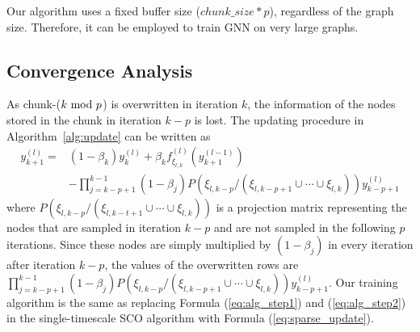 Our algorithm uses a fixed buffer size ($chunk\_size* p$), regardless of the graph size. 
Therefore, it can be employed to train GNN on very large graphs. 

\subsection{Convergence Analysis} 
As chunk-($k\ \mathrm{mod}\ p$) is overwritten in iteration $k$, the information of the nodes stored in the chunk in iteration $k-p$ is lost.  
The updating procedure in Algorithm~\ref{alg:update} can be written as 
  \begin{equation}
    \label{eq:sparse_update}
    \begin{split}
      y^{(l)}_{k+1} = &(1-\beta_{k})y^{(l)}_k + \beta_{k}  f^{(l)}_{\xi_{l,k}}(y^{(l-1)}_{k+1})\\
               &-\prod_{j=k-p+1}^{k-1}(1-\beta_j)P(\xi_{l, {k-p}}/(\xi_{l,{k-p+1}}\cup\cdots \cup\xi_{l,k}))y^{(l)}_{k-p+1}
    \end{split}
  \end{equation}
   where $P(\xi_{l, {k-p}}/(\xi_{l,{k-t+1}}\cup\cdots \cup\xi_{l,k}))$ is a projection matrix representing the nodes that are sampled in iteration $k-p$ and are not sampled in the following $p$ iterations. 
  Since these nodes are simply multiplied by $(1-\beta_j)$ in every iteration after iteration $k-p$, the values of the overwritten rows are $\prod_{j=k-p+1}^{k-1}(1-\beta_j)P(\xi_{l, {k-p}}/(\xi_{l,{k-p+1}}\cup\cdots \cup\xi_{l,k}))y^{(l)}_{k-p+1}$. 
  Our training algorithm is the same as replacing Formula (\ref{eq:alg_step1}) and (\ref{eq:alg_step2}) in the single-timescale SCO algorithm with Formula (\ref{eq:sparse_update}). 


